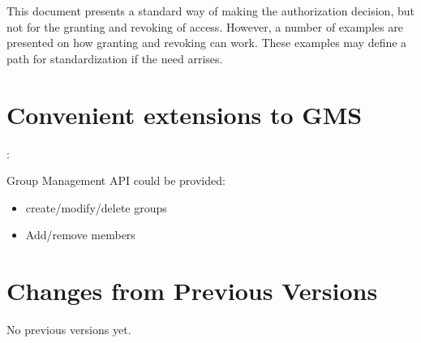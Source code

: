 \documentclass[11pt,a4paper]{ivoa}
\begin{document}
This document presents a standard way of making the authorization decision, but not for the granting and revoking of access.  However, a number of examples are presented on how granting and revoking can work.  These examples may define a path for standardization if the need arrises.

\appendix

\section{Convenient extensions to GMS}:

Group Management API could be provided:
\begin{itemize}
\item create/modify/delete groups
\item Add/remove members
\end{itemize}

\section{Changes from Previous Versions}

No previous versions yet.



\end{document}
